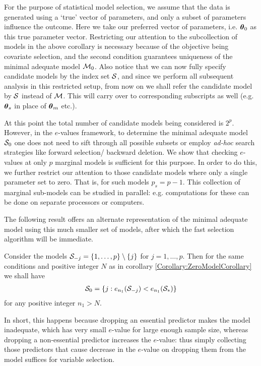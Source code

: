 For  the purpose of statistical model selection, we assume that the data is generated using a `true' vector of parameters, and only a subset of parameters influence the outcome. Here we take our preferred vector of parameters, i.e. ${\boldsymbol{\theta}}_0$ as this true parameter vector. Restricting our attention to the subcollection of models in the above corollary is necessary because of the objective being covariate selection, and the second condition guarantees uniqueness of the minimal adequate model ${\cal{M}}_{0}$. Also notice that we can now fully specify candidate models by the index set ${\cal{S}}$, and since we perform all subsequent analysis in this restricted setup, from now on we shall refer the candidate model by ${\cal{S}}$ instead of ${\cal{M}}$. This will carry over to corresponding subscripts as well (e.g. ${\boldsymbol{\theta}}_{s}$ in place of ${\boldsymbol{\theta}}_{m}$ etc.). 

At this point the total number of candidate models being considered is $2^{p}$. However, in the $e$-values framework, to determine the minimal adequate model ${\cal{S}}_{0}$  one does not need to sift through all possible subsets or employ \textit{ad-hoc} search strategies like forward selection/ backward deletion. We show that checking $e$-values at only $p$ marginal models is sufficient for this purpose. In order to do this, we further restrict our attention to those candidate models where only a single parameter set to zero. That is, for such models $p_{s} = p - 1$. This collection of marginal sub-models can be studied in parallel: e.g. computations for these can be done on separate processors or computers.

The following result offers an alternate representation of the minimal adequate model using this much smaller set of models, after which the fast selection algorithm will be immediate.

\begin{Corollary}\label{Corollary:AlgoCorollary}
Consider the models ${\cal{S}}_{-j} = \{ 1, \ldots ,p \} \setminus \{ j \}$ for $j = 1, \ldots ,p$. Then for the same conditions and positive integer $N$ as in corollary \ref{Corollary:ZeroModelCorollary} we shall have
%
\begin{align}
{\cal{S}}_{0} = \lbrace j: e_{n_1} ({\cal{S}}_{-j}) < e_{n_1} ({\cal{S}}_{*}) \rbrace
\end{align}
%
for any positive integer $n_1 > N$.
\end{Corollary}

In short, this happens because dropping an essential predictor makes the model inadequate, which has very small $e$-value for large enough sample size, whereas dropping a non-essential predictor increases the $e$-value: thus simply collecting those predictors that cause decrease in the $e$-value on dropping them from the model suffices for variable selection.

